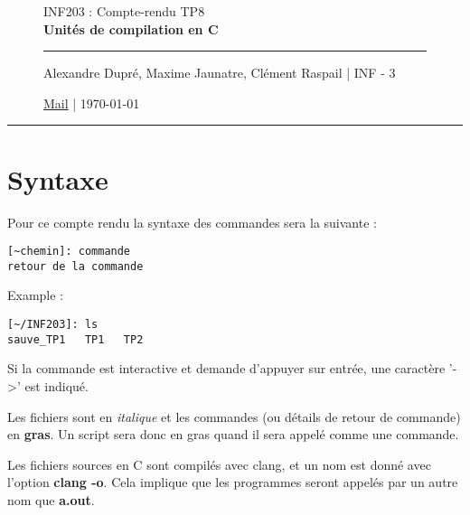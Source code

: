 \documentclass[12pt,a4paper,notitlepage,colorinlistoftodos]{article}
\begin{document}
\begin{figure}
    \begin{minipage}{.75\textwidth}
    \begin{center}
    {\Large INF203 : Compte-rendu TP8 \\ \textbf{Unités de compilation en C}}
    \end{center}
    \rule{7em}{.4pt}\par
     Alexandre Dupré, Maxime Jaunatre, Clément Raspail | INF - 3 \par 
     \href{mailto:alexandre.dupre@etu.univ-grenoble-alpes.fr,maxime.jaunatre@etu.univ-grenoble-alpes.fr, clement.raspail@etu.univ-grenoble-alpes.fr}{Mail} | \today
\end{minipage}
\end{figure}

\hrule

\section*{Syntaxe}

\iffalse
 Alexandre Dupré <alexandre.dupre@etu.univ-grenoble-alpes.fr>
 Maxime Jaunatre <maxime.jaunatre@etu.univ-grenoble-alpes.fr> 
 Clément Raspail <clement.raspail@etu.univ-grenoble-alpes.fr>
\fi

Pour ce compte rendu la syntaxe des commandes sera la suivante :
\begin{lstlisting}
[~chemin]: commande
retour de la commande
\end{lstlisting}

Example :
\begin{lstlisting}
[~/INF203]: ls
sauve_TP1   TP1   TP2
\end{lstlisting}

Si la commande est interactive et demande d'appuyer  sur entrée, une caractère '->' est indiqué.

Les fichiers sont en \textit{italique} et les commandes (ou détails de retour de commande) en \textbf{gras}. Un script sera donc en gras quand il sera appelé comme une commande.


Les fichiers sources en C sont compilés avec clang, et un nom est donné avec l'option \textbf{clang -o}. Cela implique que les programmes seront appelés par un autre nom que \textbf{a.out}.
\end{document}

